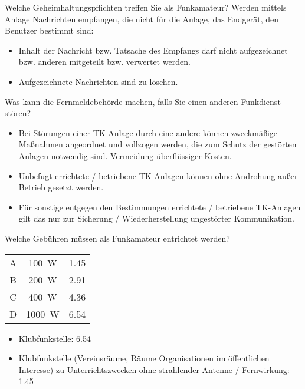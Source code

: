 \documentclass[avery5371,grid,frame,a4paper]{flashcards}
\newcommand{\card}[3]{
  \begin{flashcard}[{\chap} -- #1]{#2}#3\end{flashcard}
}
\begin{document}
\card{15}{Welche Geheimhaltungspflichten treffen Sie als Funkamateur?}{
  Werden mittels Anlage Nachrichten empfangen, die nicht für die Anlage, das Endgerät, den Benutzer bestimmt sind:

  \begin{itemize}
    \item Inhalt der Nachricht bzw. Tatsache des Empfangs darf nicht aufgezeichnet bzw. anderen mitgeteilt bzw. verwertet werden.
    \item Aufgezeichnete Nachrichten sind zu löschen.
  \end{itemize}
}

\card{16}{Was kann die Fernmeldebehörde machen, falls Sie einen anderen Funkdienst stören?}{
  \small
  \begin{itemize}
    \item Bei Störungen einer TK-Anlage durch eine andere können zweckmäßige Maßnahmen angeordnet und vollzogen werden, die zum Schutz der gestörten Anlagen notwendig sind. Vermeidung überflüssiger Kosten.
    \item Unbefugt errichtete / betriebene TK-Anlagen können ohne Androhung außer Betrieb gesetzt werden.
    \item Für sonstige entgegen den Bestimmungen errichtete / betriebene TK-Anlagen gilt das nur zur Sicherung / Wiederherstellung ungestörter Kommunikation.
  \end{itemize}
}

\card{17}{Welche Gebühren müssen als Funkamateur entrichtet werden?}{
  \begin{center}
    \begin{tabular}{ccc}
      A & \SI{100}{\watt} & \SI{1,45}{\EUR} \\
      B & \SI{200}{\watt} & \SI{2,91}{\EUR} \\
      C & \SI{400}{\watt} & \SI{4,36}{\EUR} \\
      D & \SI{1000}{\watt} & \SI{6,54}{\EUR}
    \end{tabular}
  \end{center}
  \begin{itemize}
    \item Klubfunkstelle: \SI{6,54}{\EUR}
    \item Klubfunkstelle (Vereinsräume, Räume Organisationen im öffentlichen Interesse) zu Unterrichtszwecken ohne strahlender Antenne / Fernwirkung: \SI{1,45}{\EUR}
  \end{itemize}
}
\end{document}
